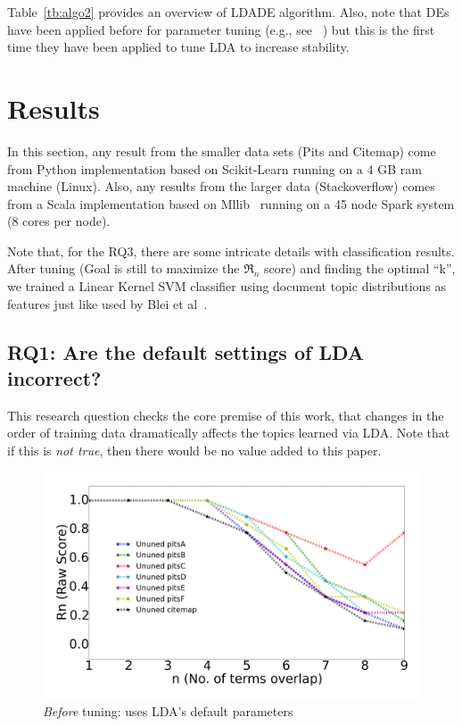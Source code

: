 \documentclass[twocolumn,5p,sort&compress]{elsarticle}
\theoremstyle{break}
\begin{document}
Table~\ref{tb:algo2} provides an overview of LDADE algorithm. Also, note that DEs have been
applied before for parameter tuning (e.g., see~\cite{omran2005differential,chiha2012tuning, fu2016tuning} ) but this is the first time they have been
applied to tune LDA to increase stability.

\section{Results}\label{sect:results}

In this section,
 any result from the smaller data sets (Pits and Citemap) come
from Python implementation based on Scikit-Learn running on a 4 GB ram machine (Linux).
Also,
  any results from the larger data (Stackoverflow) comes from a Scala implementation
  based on Mllib~\cite{meng2016mllib} running on a 45 node Spark system (8 cores per node).
  
  Note that, for the RQ3, there are some intricate details with classification results. After tuning (Goal is still to maximize the $\Re_n$ score) and finding the optimal ``k'', we trained a Linear Kernel SVM classifier using document topic distributions as features just like used by Blei et al~\cite{blei2003latent}. 


\subsection{\textbf{RQ1: Are the default settings of LDA incorrect?}}\label{sect:unstable}


This research question checks the core premise of this work, that changes
in the order of training data dramatically affects the topics learned via LDA.
Note that if this is {\em not true}, then there would be no value added to this paper. 


 
\begin{figure}[!b]
  \begin{center}
    \includegraphics[width=\linewidth]{./fig/Vem_untuned.png}
    \end{center}
  \caption{{\em Before} tuning: uses LDA's default parameters}\label{fig:delta11}  
\end{figure}
\end{document}
